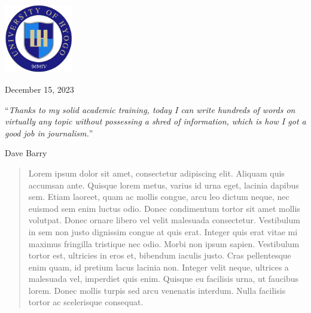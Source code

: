 \documentclass[
  letterpaper,
  11pt,
  english,
  singlespacing,
  headsepline]{MastersDoctoralThesis}
\begin{document}
\begin{titlepage}
\begin{center}
\vfill

\includegraphics[height=3cm]{images/kendailogo.png} %

{\large December 15, 2023}\\[4cm] %

 
\vfill
\end{center}
\end{titlepage}

\begin{declaration}
\addchaptertocentry{\authorshipname} %


\end{declaration}

\cleardoublepage


\vspace*{0.2\textheight}

\noindent``{\itshape Thanks to my solid academic training, today I can
write hundreds of words on virtually any topic without possessing a
shred of information, which is how I got a good job in
journalism.}''\bigbreak

\hfill Dave Barry



\begin{abstract}
\addchaptertocentry{\abstractname} %
Lorem ipsum dolor sit amet, consectetur adipiscing elit. Aliquam quis
accumsan ante. Quisque lorem metus, varius id urna eget, lacinia dapibus
sem. Etiam laoreet, quam ac mollis congue, arcu leo dictum neque, nec
euismod sem enim luctus odio. Donec condimentum tortor sit amet mollis
volutpat. Donec ornare libero vel velit malesuada consectetur.
Vestibulum in sem non justo dignissim congue at quis erat. Integer quis
erat vitae mi maximus fringilla tristique nec odio. Morbi non ipsum
sapien. Vestibulum tortor est, ultricies in eros et, bibendum iaculis
justo. Cras pellentesque enim quam, id pretium lacus lacinia non.
Integer velit neque, ultrices a malesuada vel, imperdiet quis enim.
Quisque eu facilisis urna, ut faucibus lorem. Donec mollis turpis sed
arcu venenatis interdum. Nulla facilisis tortor ac scelerisque
consequat.
\end{abstract}
\end{document}
